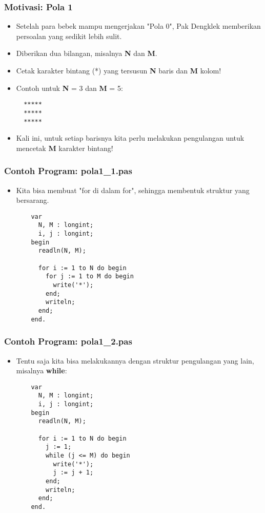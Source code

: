 \documentclass{beamer}
\begin{document}
\begin{frame}[fragile]
\frametitle{Motivasi: Pola 1}
\begin{itemize}
  \item Setelah para bebek mampu mengerjakan "Pola 0", Pak Dengklek memberikan persoalan yang sedikit lebih sulit.
  \item Diberikan dua bilangan, misalnya \textbf{N} dan \textbf{M}.
  \item Cetak karakter bintang (*) yang tersusun \textbf{N} baris dan \textbf{M} kolom!

  \item Contoh untuk \textbf{N} = 3 dan \textbf{M} = 5:
  \begin{lstlisting}
  *****
  *****
  *****
  \end{lstlisting}

  \item Kali ini, untuk setiap barisnya kita perlu melakukan pengulangan untuk mencetak \textbf{M} karakter bintang!
\end{itemize}
\end{frame}

\begin{frame}[fragile]
\frametitle{Contoh Program: pola1\_1.pas}
\begin{itemize}
  \item Kita bisa membuat "for di dalam for", sehingga membentuk struktur yang bersarang.
  \begin{lstlisting}
    var
      N, M : longint;
      i, j : longint;
    begin
      readln(N, M);

      for i := 1 to N do begin
        for j := 1 to M do begin
          write('*');
        end;
        writeln;
      end;
    end.
  \end{lstlisting}
\end{itemize}
\end{frame}

\begin{frame}[fragile]
\frametitle{Contoh Program: pola1\_2.pas}
\begin{itemize}
  \item Tentu saja kita bisa melakukannya dengan struktur pengulangan yang lain, misalnya \textbf{while}:
  \begin{lstlisting}
    var
      N, M : longint;
      i, j : longint;
    begin
      readln(N, M);

      for i := 1 to N do begin
        j := 1;
        while (j <= M) do begin
          write('*');
          j := j + 1;
        end;
        writeln;
      end;
    end.
  \end{lstlisting}
\end{itemize}
\end{frame}
\end{document}
